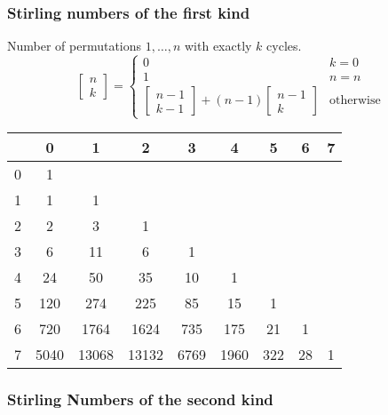 \subsubsection{Stirling numbers of the first kind}
Number of permutations $1, \dots, n$ with exactly $k$ cycles.
\begin{equation*}
  \begin{bmatrix}
    n\\k
  \end{bmatrix} =
  \begin{cases}
    0 & k = 0\\
    1 & n = n\\
    \left[
      \begin{smallmatrix}
        n - 1\\k - 1
      \end{smallmatrix}
\right] + (n - 1) \left[
  \begin{smallmatrix}
    n-1\\k
  \end{smallmatrix}
\right] & \text{otherwise}
  \end{cases}
\end{equation*}

\begin{center}
	\begin{tabular}{ |l||c|c|c|c|c|c|c|c| } 
		\hline
		\diagbox{$n$}{$k$} & 0 & 1 & 2 & 3 & 4 & 5 & 6 & 7  \\
		\hline\hline
		0 &  1    &       &       &      &      &     &     &  \\
		1 &  1    & 1     &       &      &      &     &     &  \\
		2 &  2    & 3     & 1     &      &      &     &     &  \\
		3 &  6    & 11    & 6     & 1    &      &     &     &  \\
		4 &  24   & 50    & 35    & 10   & 1    &     &     &  \\
		5 &  120  & 274   & 225   & 85   & 15   & 1   &     &  \\
		6 &  720  & 1764  & 1624  & 735  & 175  & 21  & 1   &  \\
		7 &  5040 & 13068 & 13132 & 6769 & 1960 & 322 & 28 & 1 \\
		\hline
	\end{tabular}
\end{center}

\subsubsection{Stirling Numbers of the second kind}

